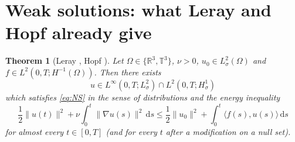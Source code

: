 \documentclass[11pt]{article}
\newtheorem{theorem}{Theorem}[section]
\theoremstyle{remark}
\newcommand{\R}{\mathbb{R}}
\newcommand{\T}{\mathbb{T}}
\newcommand{\dd}{\,\mathrm{d}}
\newcommand{\norm}[1]{\lVert #1\rVert}
\newcommand{\ip}[2]{\langle #1,#2\rangle}
\begin{document}
\section{Weak solutions: what Leray and Hopf already give}\label{sec:weak}

\begin{theorem}[Leray \cite{Leray1934}, Hopf \cite{Hopf1951}]\label{thm:lerayhopf}
Let $\Omega\in\{\R^3,\T^3\}$, $\nu>0$, $u_0\in L^2_\sigma(\Omega)$ and
$f\in L^2(0,T;H^{-1}(\Omega))$. Then there exists
\[
u\in L^\infty(0,T;L^2_\sigma)\cap L^2(0,T;H^1_\sigma)
\]
which satisfies \eqref{eq:NS} in the sense of distributions and the energy inequality
\begin{equation}\label{eq:energyineq}
\frac12\norm{u(t)}^2+\nu\int_0^t\norm{\nabla u(s)}^2\dd s
\le\frac12\norm{u_0}^2+\int_0^t\ip{f(s)}{u(s)}\dd s
\end{equation}
for almost every $t\in[0,T]$ (and for every $t$ after a modification on a null set).
\end{theorem}
\end{document}
